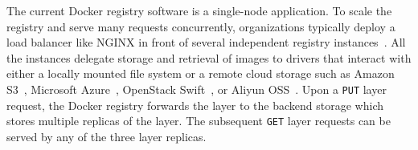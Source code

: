 The current Docker registry software is a single-node application.
%
To scale the registry and serve many requests concurrently, organizations typically deploy a load
balancer like NGINX in front of several independent registry
instances~\cite{dockerworkload, anwar-cloud19}.
%
All the instances delegate storage and retrieval of images to drivers that interact with
either a locally mounted file system or a remote cloud storage such as Amazon
S3~\cite{s3}, Microsoft Azure~\cite{azure}, OpenStack Swift~\cite{swift}, or
Aliyun OSS~\cite{aliyun}.
%
%
Upon a \texttt{PUT} layer request, the Docker registry forwards the layer to the
backend storage which stores multiple replicas of the layer.
%
The subsequent \texttt{GET} layer requests can be served by any of the three
layer replicas.
%


%
%
%
%
%
%
%
